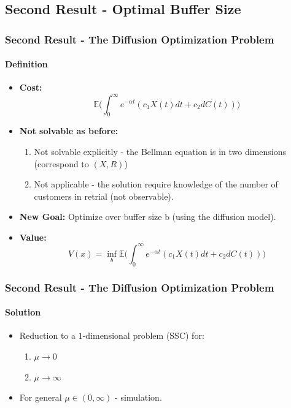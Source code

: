 \documentclass{beamer}
\begin{document}
\subsection{Second Result - Optimal Buffer Size}
\begin{frame}
  \frametitle{Second Result - The Diffusion Optimization Problem}
  \framesubtitle{Definition}

  \vfill
  \begin{itemize}[<+->]
  \item {\bf Cost:}  
    \[
    \mathbb{E} \Big(\int_{0}^{\infty} e^{-\alpha t} (c_1 X(t)dt+c_2 dC(t))\Big)
    \]
    \vfill
  \item {\bf Not solvable as before:}
    \begin{enumerate}[<+->]%
    \item Not solvable explicitly - the Bellman equation is in two dimensions (correspond to $(X,R)$)
    \item Not applicable - the solution require knowledge of the number of customers in retrial (not observable).  
    \end{enumerate}
    \vfill
  \item {\bf New Goal:} Optimize over buffer size b (using the diffusion model). 
\vfill
\item {\bf Value:}
   \[
    V(x)=\inf_{b} \mathbb{E} \Big(\int_{0}^{\infty} e^{-\alpha t} (c_1 X(t)dt+c_2 dC(t))\Big)
    \]
  \end{itemize}
  \vfill 
\end{frame}

\begin{frame}
  \frametitle{Second Result - The Diffusion Optimization Problem}
  \framesubtitle{Solution}

  \vfill
  \begin{itemize}[<+->]%
  \item Reduction to a $1$-dimensional problem (SSC) for: 

    \begin{enumerate}[<+->]%
    \item $\mu \to 0$
    \item $\mu \to \infty$
    \end{enumerate}
    \vfill
  \item For general $\mu\in (0,\infty)$ - simulation.

  \end{itemize}
  \vfill

\end{frame}
\end{document}
